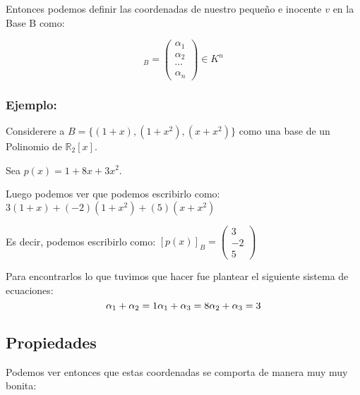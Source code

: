 \documentclass[12pt]{report}							    %
\begin{document}
        Entonces podemos definir las coordenadas de nuestro pequeño e inocente $v$ en la Base B como:

        \begin{equation}
            [v]_B = 
            \begin{pmatrix} 
                \alpha_1    \\
                \alpha_2    \\
                \cdots      \\
                \alpha_n 
            \end{pmatrix}
            \in K^n
        \end{equation}


        \clearpage

        \subsubsection{Ejemplo:}
        Considerere a $B = \{ (1+x), (1+x^2) , (x + x^2) \}$ como una base de un Polinomio de $\mathbb{R}_2[x]$.

        Sea $p(x) = 1+8x+3x^2$.

        Luego podemos ver que podemos escribirlo como:
        $3(1+x) + (-2)(1+x^2) + (5)(x+x^2)$

        Es decir, podemos escribirlo como:
        $[p(x)]_B =  \begin{pmatrix} 3\\-2\\5\end{pmatrix}$
         

        Para encontrarlos lo que tuvimos que hacer fue plantear el siguiente sistema de ecuaciones:
        \begin{equation*}
            \alpha_1 + \alpha_2 = 1  \\
            \alpha_1 + \alpha_3 = 8  \\
            \alpha_2 + \alpha_3 = 3  \\
        \end{equation*}


        \subsection{Propiedades}
        Podemos ver entonces que estas coordenadas se comporta de manera muy muy bonita:
\end{document}
